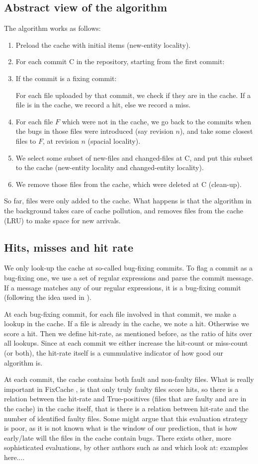 \documentclass[12pt,twoside,notitlepage]{report}
\newcommand{\fxch}{FixCache }
\begin{document}
\subsection{Abstract view of the algorithm}
The algorithm works as follows:
\begin{enumerate}
	\item Preload the cache with initial items (new-entity locality).
	\item For each commit C in the repository, starting from the first commit:
	\item If the commit is a fixing commit:
		
	For each file uploaded by that commit, we check if they are in the cache. If a file is in the cache, we record a hit, else we record a miss.
	\item For each file $F$ which were not in the cache, we go back to the commits when the bugs in those files were introduced (say revision $n$), and take some closest files to $F$, at revision $n$ (spacial locality).
	\item We select some subset of new-files and changed-files at C, and put this subset to the cache (new-entity locality and changed-entity locality).
	\item We remove those files from the cache, which were deleted at C (clean-up).
\end{enumerate}
So far, files were only added to the cache. What happens is that the algorithm in the background takes care of cache pollution, and removes files from the cache (LRU) to make space for new arrivals.
\subsection{Hits, misses and hit rate}
We only look-up the cache at so-called bug-fixing commits. To flag a commit as a bug-fixing one, we use a set of regular expressions and parse the commit message. If a message matches any of our regular expressions, it is a bug-fixing commit (following the idea used in \cite{KimZim}).

At each bug-fixing commit, for each file involved in that commit, we make a lookup in the cache. If a file is already in the cache, we note a hit. Otherwise we score a hit. Then we define hit-rate, as mentioned before, as the ratio of hits over all lookups. Since at each commit we either increase the hit-count or miss-count (or both), the hit-rate itself is a cummulative indicator of how good our algorithm is. 

At each commit, the cache contains both fault and non-faulty files. What is really important in \fxch, is that only truly faulty files score hits, so there is a relation between the hit-rate and True-positives (files that are faulty and are in the cache) in the cache itself, that is there is a relation between hit-rate and the number of identified faulty files. Some might argue that this evaluation strategy is poor, as it is not known what is the window of our prediction, that is how early/late will the files in the cache contain bugs. There exists other, more sophisticated evaluations, by other authors such as \cite{Sadowski} and \cite{Bugcache} which look at: examples here....
\end{document}
